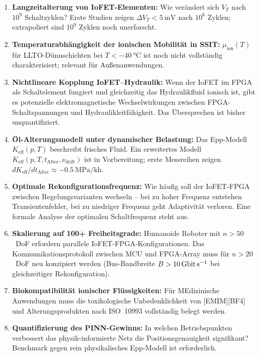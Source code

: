 ﻿\documentclass[a4paper,12pt]{scrreprt}
\theoremstyle{definition}
\begin{document}
\begin{enumerate}
  \item \textbf{Langzeitalterung von IoFET-Elementen:}
        Wie verändert sich $V_T$ nach $10^9$ Schaltzyklen?
        Erste Studien zeigen $\Delta V_T < \SI{5}{\milli\volt}$ nach
        $10^6$ Zyklen; extrapoliert sind $10^9$ Zyklen noch unerforscht.

  \item \textbf{Temperaturabhängigkeit der ionischen Mobilität
        in SSIT:} $\mu_{\text{ion}}(T)$ für LLTO-Dünnschichten
        bei $T < \SI{-40}{\celsius}$ ist noch nicht vollständig
        charakterisiert; relevant für Außenanwendungen.

  \item \textbf{Nichtlineare Kopplung IoFET--Hydraulik:}
        Wenn der IoFET im FPGA als Schaltelement fungiert und
        gleichzeitig das Hydraulikfluid ionisch ist, gibt es
        potenzielle elektromagnetische Wechselwirkungen
        zwischen FPGA-Schaltspannungen und Hydraulikleitfähigkeit.
        Das Übersprechen ist bisher unquantifiziert.

  \item \textbf{Öl-Alterungsmodell unter dynamischer Belastung:}
        Das Epp-Modell $K_{\text{eff}}(p,T)$ beschreibt frisches Fluid.
        Ein erweitertes Modell $K_{\text{eff}}(p,T,t_{\text{Alter}},\nu_{\text{drift}})$
        ist in Vorbereitung; erste Messreihen zeigen
        $dK_{\text{eff}}/dt_{\text{Alter}} \approx \SI{-0.5}{\mega\pascal\per\kilo\hour}$.

  \item \textbf{Optimale Rekonfigurationsfrequenz:}
        Wie häufig soll der IoFET-FPGA zwischen Regelungsvarianten
        wechseln -- bei zu hoher Frequenz entstehen Transientenfehler,
        bei zu niedriger Frequenz geht Adaptivität verloren.
        Eine formale Analyse der optimalen Schaltfrequenz steht aus.

  \item \textbf{Skalierung auf 100+ Freiheitsgrade:}
        Humanoide Roboter mit $n > 50$~DoF erfordern parallele
        IoFET-FPGA-Konfigurationen. Das Kommunikationsprotokoll
        zwischen MCU und FPGA-Array muss für $n > 20$~DoF
        neu konzipiert werden (Bus-Bandbreite $B > \SI{10}{\giga\bit\per\second}$
        bei gleichzeitiger Rekonfiguration).

  \item \textbf{Biokompatibilität ionischer Flüssigkeiten:}
        Für ME\-di\-zi\-ni\-sche Anwendungen muss die toxikologische
        Unbedenklichkeit von [EMIM][BF4] und Alterungsprodukten
        nach ISO~10993 vollständig belegt werden.

  \item \textbf{Quantifizierung des PINN-Gewinns:}
        In welchen Betriebspunkten verbessert das physik-informierte
        Netz die Positionsgenauigkeit signifikant? Benchmark gegen
        rein physikalisches Epp-Modell ist erforderlich.
\end{enumerate}
\end{document}
